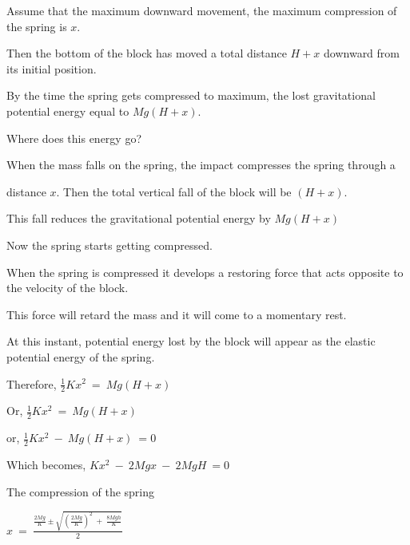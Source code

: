 \documentclass{article}
\begin{document}
Assume that the maximum downward movement, the maximum compression of the spring is $x$.

Then the bottom of the block  has moved  a total distance $H+x$ downward from its initial position.

By the time the spring gets compressed to maximum, the  lost  gravitational potential energy  equal to $Mg(H+x)$.

Where does this energy go?

When the mass falls on the spring, the impact compresses the spring through a

distance $x$. Then the total vertical fall of the block will be $(H+x)$.

This fall reduces the gravitational potential energy by $Mg(H+x)$

Now the spring starts getting compressed.

When the spring is compressed it develops a restoring force that acts opposite to the velocity of the block. 

This force will retard the mass and it will come to a momentary rest.

At this instant, potential energy lost by the block will appear as the elastic potential energy of the spring.

Therefore, $\frac{1}{2}Kx^2\:=\:Mg(H+x)$

Or, $\frac{1}{2}Kx^2\:=\:Mg(H+x)$

or, $\frac{1}{2}Kx^2\:-\:Mg(H+x)\:=0$                                   

Which becomes, $Kx^2\:-\:2Mgx\:-\:2MgH\:=0$

The compression of the spring

$x\:=\:\frac{\frac{2Mg}{K}\pm \sqrt{(\frac{2Mg}{K})^2 \:+\:\frac{8Mgh}{K}}}{2}$
\end{document}
